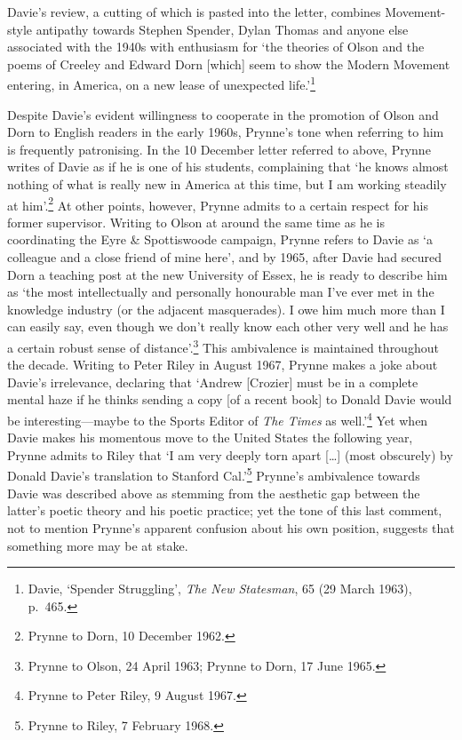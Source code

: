 \documentclass[]{article}
\begin{document}
\noindent Davie’s review, a cutting of which is pasted into the letter,
combines Movement-style antipathy towards Stephen Spender, Dylan Thomas
and anyone else associated with the 1940s with enthusiasm for ‘the
theories of Olson and the poems of Creeley and Edward Dorn {[}which{]}
seem to show the Modern Movement entering, in America, on a new lease of
unexpected life.’\footnote{Davie, ‘Spender Struggling’, \emph{The New
  Statesman}, 65 (29 March 1963), p.~465.}

Despite Davie’s evident willingness to cooperate in the promotion of
Olson and Dorn to English readers in the early 1960s, Prynne’s tone when
referring to him is frequently patronising. In the 10 December letter
referred to above, Prynne writes of Davie as if he is one of his
students, complaining that ‘he knows almost nothing of what is really
new in America at this time, but I am working steadily at
him’.\footnote{Prynne to Dorn, 10 December 1962.} At other points,
however, Prynne admits to a certain respect for his former supervisor.
Writing to Olson at around the same time as he is coordinating the Eyre
\& Spottiswoode campaign, Prynne refers to Davie as ‘a colleague and a
close friend of mine here’, and by 1965, after Davie had secured Dorn a
teaching post at the new University of Essex, he is ready to describe
him as ‘the most intellectually and personally honourable man I’ve ever
met in the knowledge industry (or the adjacent masquerades). I owe him
much more than I can easily say, even though we don’t really know each
other very well and he has a certain robust sense of
distance’.\footnote{Prynne to Olson, 24 April 1963; Prynne to Dorn, 17
  June 1965.} This ambivalence is maintained throughout the decade.
Writing to Peter Riley in August 1967, Prynne makes a joke about Davie’s
irrelevance, declaring that ‘Andrew {[}Crozier{]} must be in a complete
mental haze if he thinks sending a copy {[}of a recent book{]} to Donald
Davie would be interesting—maybe to the Sports Editor of \emph{The
Times} as well.’\footnote{Prynne to Peter Riley, 9 August 1967.} Yet
when Davie makes his momentous move to the United States the following
year, Prynne admits to Riley that ‘I am very deeply torn apart
{[}\ldots{}{]} (most obscurely) by Donald Davie’s translation to
Stanford Cal.’\footnote{Prynne to Riley, 7 February 1968.} Prynne’s
ambivalence towards Davie was described above as stemming from the
aesthetic gap between the latter’s poetic theory and his poetic
practice; yet the tone of this last comment, not to mention Prynne’s
apparent confusion about his own position, suggests that something more
may be at stake.
\end{document}

